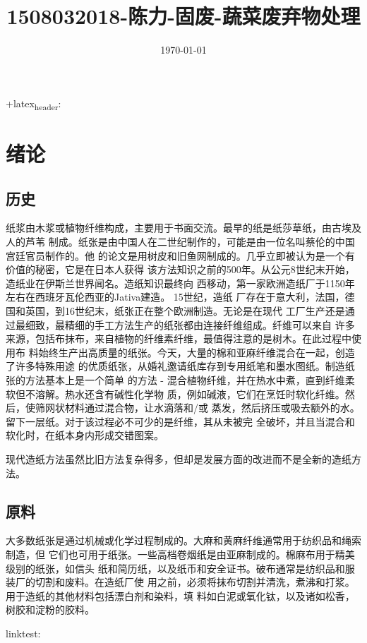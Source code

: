 \documentclass[11pt]{article}
\date{\today}
\title{1508032018-陈力-固废-蔬菜废弃物处理}
\begin{document}
\maketitle
\tableofcontents

+latex\textsubscript{header}: \usepackage{float}


\section{绪论}
\label{sec:org1756d27}

\subsection{历史}
\label{sec:org551ea11}
纸浆由木浆或植物纤维构成，主要用于书面交流。最早的纸是纸莎草纸，由古埃及人的芦苇
制成。纸张是由中国人在二世纪制作的，可能是由一位名叫蔡伦的中国宫廷官员制作的。他
的论文是用树皮和旧鱼网制成的。几乎立即被认为是一个有价值的秘密，它是在日本人获得
该方法知识之前的500年。从公元8世纪末开始，造纸业在伊斯兰世界闻名。造纸知识最终向
西移动，第一家欧洲造纸厂于1150年左右在西班牙瓦伦西亚的Jativa建造。 15世纪，造纸
厂存在于意大利，法国，德国和英国，到16世纪末，纸张正在整个欧洲制造。无论是在现代
工厂生产还是通过最细致，最精细的手工方法生产的纸张都由连接纤维组成。纤维可以来自
许多来源，包括布抹布，来自植物的纤维素纤维，最值得注意的是树木。在此过程中使用布
料始终生产出高质量的纸张。今天，大量的棉和亚麻纤维混合在一起，创造了许多特殊用途
的优质纸张，从婚礼邀请纸库存到专用纸笔和墨水图纸。制造纸张的方法基本上是一个简单
的方法 - 混合植物纤维，并在热水中煮，直到纤维柔软但不溶解。热水还含有碱性化学物
质，例如碱液，它们在烹饪时软化纤维。然后，使筛网状材料通过混合物，让水滴落和/或
蒸发，然后挤压或吸去额外的水。留下一层纸。对于该过程必不可少的是纤维，其从未被完
全破坏，并且当混合和软化时，在纸本身内形成交错图案。

现代造纸方法虽然比旧方法复杂得多，但却是发展方面的改进而不是全新的造纸方法。

\subsection{原料}
\label{sec:org5f2d3b6}
大多数纸张是通过机械或化学过程制成的。大麻和黄麻纤维通常用于纺织品和绳索制造，但
它们也可用于纸张。一些高档卷烟纸是由亚麻制成的。棉麻布用于精美级别的纸张，如信头
纸和简历纸，以及纸币和安全证书。破布通常是纺织品和服装厂的切割和废料。在造纸厂使
用之前，必须将抹布切割并清洗，煮沸和打浆。用于造纸的其他材料包括漂白剂和染料，填
料如白泥或氧化钛，以及诸如松香，树胶和淀粉的胶料。



linktest: \cite{造纸白泥制备陶瓷滤料的技术研究}



\end{document}
